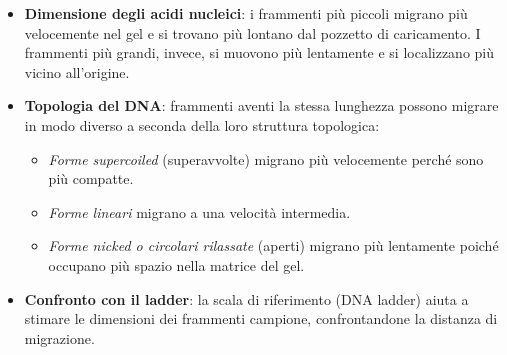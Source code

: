 \begin{itemize}
  \item \textbf{Dimensione degli acidi nucleici}: i frammenti più piccoli migrano più velocemente nel gel e si trovano più lontano dal pozzetto di caricamento. I frammenti più grandi, invece, si muovono più lentamente e si localizzano più vicino all'origine.
  
  \item \textbf{Topologia del DNA}: frammenti aventi la stessa lunghezza possono migrare in modo diverso a seconda della loro struttura topologica:
  \begin{itemize}
    \item \textit{Forme supercoiled} (superavvolte) migrano più velocemente perché sono più compatte.
    \item \textit{Forme lineari} migrano a una velocità intermedia.
    \item \textit{Forme nicked o circolari rilassate} (aperti) migrano più lentamente poiché occupano più spazio nella matrice del gel.
  \end{itemize}
  
  \item \textbf{Confronto con il ladder}: la scala di riferimento (DNA ladder) aiuta a stimare le dimensioni dei frammenti campione, confrontandone la distanza di migrazione.
\end{itemize}
\newpage